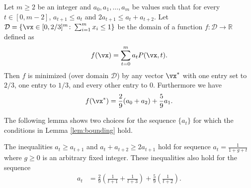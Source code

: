 \begin{lemma}
	\label{lem:bounding}
	Let $m \geq 2$ be an integer and
	$a_0, a_1, \hdots, a_m$ be values such that for every $t \in [0, m-2]$, $a_{t+1} \leq a_t$ and $2 a_{t+1} \leq a_t + a_{t+2}$.
	Let $\mathcal{D} = \{ \vx \in [0,2/3]^m \colon \sum_{i = 1}^m x_i \leq 1 \}$ be the domain of a function
	$f : \mathcal{D} \rightarrow \mathbb{R}$ defined as
	\[
	f(\vx) = \sum_{t=0}^m a_t P(\vx, t).
	\]
	Then $f$ is minimized (over domain $\mathcal{D}$) by any vector $\vx^*$ with one entry set to $2/3$, one entry to $1/3$, and every other entry to $0$. Furthermore we have
	\begin{equation}
		\label{eq:minval}
		f(\vx^*) = \frac{2}{9}(a_0 + a_2) + \frac{5}{9}a_1.
	\end{equation}
\end{lemma}
The following lemma shows two choices for the sequence $\{a_t\}$ for which the conditions in Lemma \ref{lem:bounding} hold.
\begin{lemma}
	\label{lem:bounding_constraints}
	The inequalities $a_t \geq a_{t+1}$ and $a_t + a_{t+2} \geq 2 a_{t+1}$ hold for sequence $a_t = \frac{1}{1+g+t}$ where $g \geq 0$ is an arbitrary fixed integer. These inequalities also hold for the sequence
	\begin{align*}
		a_t &= \frac{2}{9}\left( \frac{1}{t+1} + \frac{1}{t+3} \right) + \frac{5}{9} \left( \frac{1}{t+2} \right).
	\end{align*}
\end{lemma}
